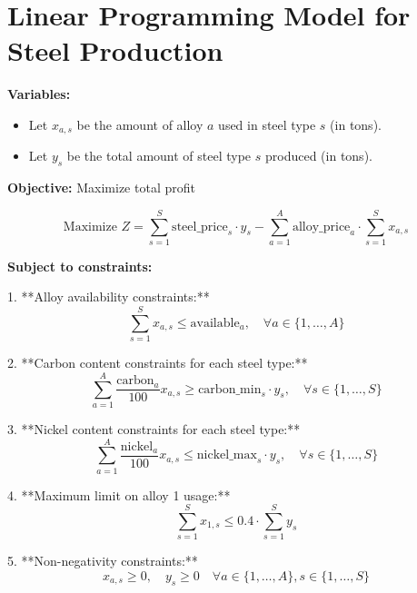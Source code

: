 \documentclass{article}
\begin{document}
\section*{Linear Programming Model for Steel Production}

\textbf{Variables:}
\begin{itemize}
    \item Let \( x_{a,s} \) be the amount of alloy \( a \) used in steel type \( s \) (in tons).
    \item Let \( y_s \) be the total amount of steel type \( s \) produced (in tons).
\end{itemize}

\textbf{Objective:} Maximize total profit

\[
\text{Maximize } Z = \sum_{s=1}^S \text{steel\_price}_s \cdot y_s - \sum_{a=1}^A \text{alloy\_price}_a \cdot \sum_{s=1}^S x_{a,s}
\]

\textbf{Subject to constraints:}

1. **Alloy availability constraints:**
\[
\sum_{s=1}^S x_{a,s} \leq \text{available}_{a}, \quad \forall a \in \{1, \ldots, A\}
\]

2. **Carbon content constraints for each steel type:**
\[
\sum_{a=1}^A \frac{\text{carbon}_{a}}{100} x_{a,s} \geq \text{carbon\_min}_{s} \cdot y_s, \quad \forall s \in \{1, \ldots, S\}
\]

3. **Nickel content constraints for each steel type:**
\[
\sum_{a=1}^A \frac{\text{nickel}_{a}}{100} x_{a,s} \leq \text{nickel\_max}_{s} \cdot y_s, \quad \forall s \in \{1, \ldots, S\}
\]

4. **Maximum limit on alloy 1 usage:**
\[
\sum_{s=1}^S x_{1,s} \leq 0.4 \cdot \sum_{s=1}^S y_s
\]

5. **Non-negativity constraints:**
\[
x_{a,s} \geq 0, \quad y_s \geq 0 \quad \forall a \in \{1, \ldots, A\}, s \in \{1, \ldots, S\}
\]
\end{document}

